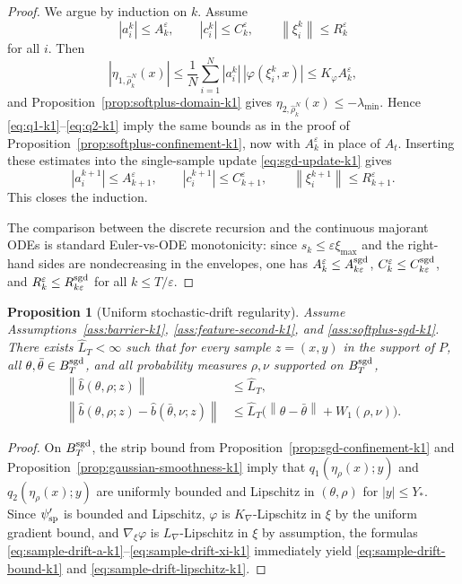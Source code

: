 \documentclass[11pt]{article}
\newtheorem{proposition}[theorem]{Proposition}
\theoremstyle{definition}
\newcommand{\norm}[1]{\left\lVert #1 \right\rVert}
\begin{document}
\begin{proof}
We argue by induction on $k$. Assume
\[
  |a_i^k|\le A_k^\varepsilon,
  \qquad
  |c_i^k|\le C_k^\varepsilon,
  \qquad
  \norm{\xi_i^k}\le R_k^\varepsilon
\]
for all $i$. Then
\[
  |\eta_{1,\hat\rho_k^N}(x)|
  \le
  \frac1N\sum_{i=1}^N |a_i^k|\,|\varphi(\xi_i^k,x)|
  \le
  K_\varphi A_k^\varepsilon,
\]
and Proposition~\ref{prop:softplus-domain-k1} gives
$\eta_{2,\hat\rho_k^N}(x)\le -\lambda_{\min}$. Hence
\eqref{eq:q1-k1}--\eqref{eq:q2-k1} imply the same bounds as in the proof of
Proposition~\ref{prop:softplus-confinement-k1}, now with $A_k^\varepsilon$ in
place of $A_t$. Inserting these estimates into the single-sample update
\eqref{eq:sgd-update-k1} gives
\[
  |a_i^{k+1}|
  \le
  A_{k+1}^\varepsilon,
  \qquad
  |c_i^{k+1}|
  \le
  C_{k+1}^\varepsilon,
  \qquad
  \norm{\xi_i^{k+1}}
  \le
  R_{k+1}^\varepsilon.
\]
This closes the induction.

The comparison between the discrete recursion and the continuous majorant ODEs
is standard Euler-vs-ODE monotonicity: since $s_k\le \varepsilon\xi_{\max}$ and
the right-hand sides are nondecreasing in the envelopes, one has
$A_k^\varepsilon\le A_{k\varepsilon}^{\rm sgd}$, $C_k^\varepsilon\le
C_{k\varepsilon}^{\rm sgd}$, and $R_k^\varepsilon\le R_{k\varepsilon}^{\rm sgd}$
for all $k\le T/\varepsilon$.
\end{proof}

\begin{proposition}[Uniform stochastic-drift regularity]
\label{prop:sample-drift-regularity-k1}
Assume Assumptions~\ref{ass:barrier-k1}, \ref{ass:feature-second-k1}, and
\ref{ass:softplus-sgd-k1}. There exists
$\widehat L_T<\infty$ such that for every sample $z=(x,y)$ in the support of
$P$, all $\theta,\bar\theta\in B_T^{\rm sgd}$, and all probability measures
$\rho,\nu$ supported on $B_T^{\rm sgd}$,
\begin{align}
  \norm{\hat b(\theta,\rho;z)}
  &\le
  \widehat L_T,
  \label{eq:sample-drift-bound-k1}
  \\
  \norm{\hat b(\theta,\rho;z)-\hat b(\bar\theta,\nu;z)}
  &\le
  \widehat L_T\bigl(\norm{\theta-\bar\theta}+W_1(\rho,\nu)\bigr).
  \label{eq:sample-drift-lipschitz-k1}
\end{align}
\end{proposition}

\begin{proof}
On $B_T^{\rm sgd}$, the strip bound from
Proposition~\ref{prop:sgd-confinement-k1} and
Proposition~\ref{prop:gaussian-smoothness-k1} imply that
$q_1(\eta_\rho(x);y)$ and $q_2(\eta_\rho(x);y)$ are uniformly bounded and
Lipschitz in $(\theta,\rho)$ for $|y|\le Y_\ast$. Since $\psi'_{\rm sp}$ is
bounded and Lipschitz, $\varphi$ is $K_{\nabla}$-Lipschitz in $\xi$ by the
uniform gradient bound, and $\nabla_\xi\varphi$ is $L_{\nabla}$-Lipschitz in
$\xi$ by assumption, the formulas
\eqref{eq:sample-drift-a-k1}--\eqref{eq:sample-drift-xi-k1} immediately yield
\eqref{eq:sample-drift-bound-k1} and \eqref{eq:sample-drift-lipschitz-k1}.
\end{proof}
\end{document}

